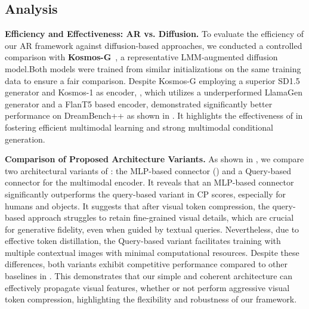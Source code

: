 \subsection{Analysis}
\label{sec:Analysis}

\textbf{Efficiency and Effectiveness: AR vs. Diffusion.}
To evaluate the efficiency of our AR framework against diffusion-based approaches, we conducted a controlled comparison with \textbf{Kosmos-G}~\citep{Kosmos-G}, a representative LMM-augmented diffusion model.Both models were trained from similar initializations on the same training data to ensure a fair comparison. Despite Kosmos-G employing a superior SD1.5 generator and Kosmos-1 as encoder, \model, which utilizes a underperformed LlamaGen generator and a FlanT5 based encoder, demonstrated significantly better performance on DreamBench++ as shown in .
It highlights the effectiveness of \model in fostering efficient multimodal learning and strong multimodal conditional generation.




\textbf{Comparison of Proposed Architecture Variants. }
As shown in , we compare two architectural variants of \model: the MLP-based connector (\model) and a Query-based connector for the multimodal encoder. It reveals that an MLP-based connector significantly outperforms the query-based variant in CP scores, especially for humans and objects. It suggests that after visual token compression, the query-based approach struggles to retain fine-grained visual details, which are crucial for generative fidelity, even when guided by textual queries.
Nevertheless, due to effective token distillation, the Query-based variant facilitates training with multiple contextual images with minimal computational resources.
Despite these differences, both variants exhibit competitive performance compared to other baselines in . This demonstrates that our simple and coherent architecture can effectively propagate visual features, whether or not perform aggressive visual token compression, highlighting the flexibility and robustness of our framework.




